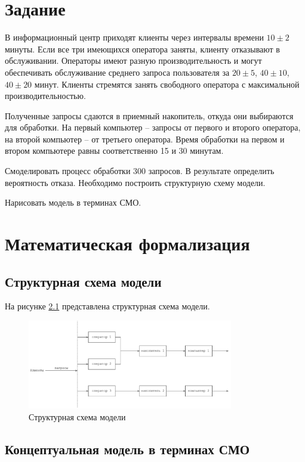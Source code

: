 \chapter{Задание}

В информационный центр приходят клиенты через интервалы времени $10\pm2$
минуты. Если все три имеющихся оператора заняты, клиенту отказывают в
обслуживании. Операторы имеют разную производительность и могут
обеспечивать обслуживание среднего запроса пользователя за $20\pm5$, $40\pm10$,
$40\pm20$ минут. Клиенты стремятся занять свободного оператора с максимальной
производительностью. 

Полученные запросы сдаются в приемный накопитель,
откуда они выбираются для обработки. На первый компьютер -- запросы от
первого и второго оператора, на второй компьютер -- от третьего оператора.
Время обработки на первом и втором компьютере равны соответственно 15 и 30
минутам.

Смоделировать процесс обработки 300 запросов. В результате определить вероятность отказа.
Необходимо построить структурную схему модели.

Нарисовать модель в терминах СМО.

\chapter{Математическая формализация}

\section{Структурная схема модели}

\noindent На рисунке \ref{fig:struct} представлена структурная схема модели.
\begin{figure}[H]
	\centering
	\includegraphics[width=0.8\textwidth]{assets/struct.pdf}
	\caption{Структурная схема модели}
	\label{fig:struct}
\end{figure}

\section{Концептуальная модель в терминах СМО}

